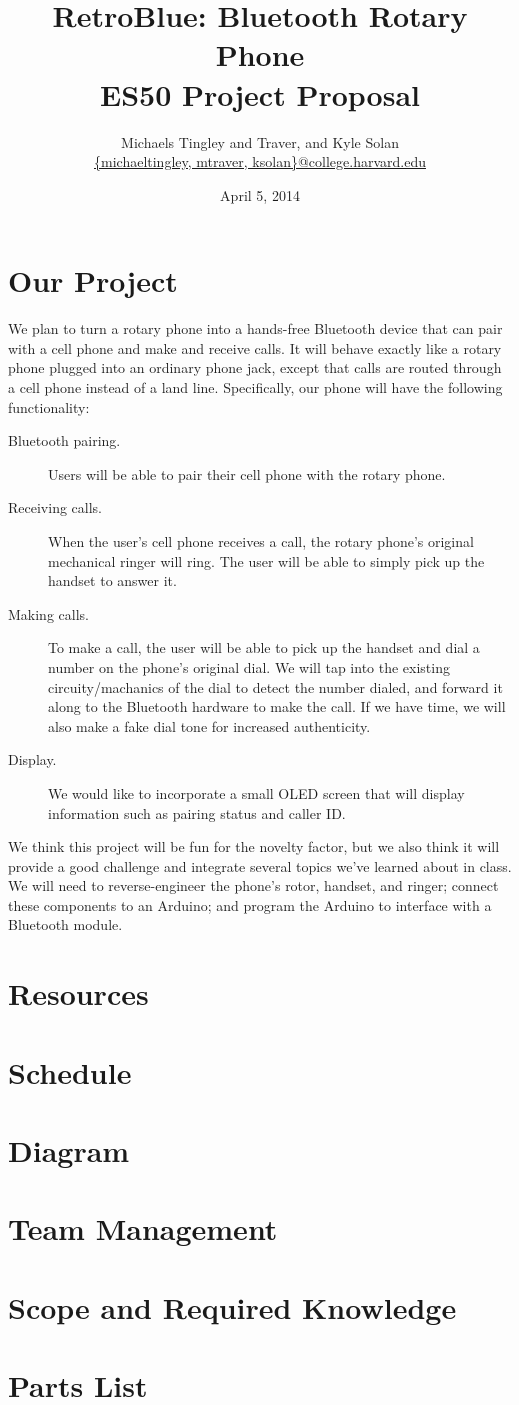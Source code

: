 \documentclass[11pt]{article}
\title{RetroBlue: Bluetooth Rotary Phone\\ES50 Project Proposal}
\author{Michaels Tingley and Traver, and Kyle Solan\\\url{{michaeltingley, mtraver, ksolan}@college.harvard.edu}}
\date{April 5, 2014}
\begin{document}
    \maketitle

    \section{Our Project}
    We plan to turn a rotary phone into a hands-free Bluetooth device that can pair with a cell phone and make and receive calls. It will behave exactly like a rotary phone plugged into an ordinary phone jack, except that calls are routed through a cell phone instead of a land line. Specifically, our phone will have the following functionality:

    \begin{description}
        \item[Bluetooth pairing.] Users will be able to pair their cell phone with the rotary phone.
        \item[Receiving calls.] When the user's cell phone receives a call, the rotary phone's original mechanical ringer will ring. The user will be able to simply pick up the handset to answer it.
        \item[Making calls.] To make a call, the user will be able to pick up the handset and dial a number on the phone's original dial. We will tap into the existing circuity/machanics of the dial to detect the number dialed, and forward it along to the Bluetooth hardware to make the call. If we have time, we will also make a fake dial tone for increased authenticity.
        \item[Display.] We would like to incorporate a small OLED screen that will display information such as pairing status and caller ID.
    \end{description}

    We think this project will be fun for the novelty factor, but we also think it will provide a good challenge and integrate several topics we've learned about in class. We will need to reverse-engineer the phone's rotor, handset, and ringer; connect these components to an Arduino; and program the Arduino to interface with a Bluetooth module.

    \section{Resources}


    \section{Schedule}


    \section{Diagram}


    \section{Team Management}


    \section{Scope and Required Knowledge}


    \section{Parts List}
\end{document}

